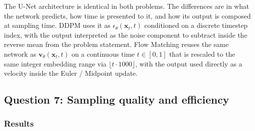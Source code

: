 \documentclass{article}
\begin{document}
The U-Net architecture is identical in both problems. The differences are
in what the network predicts, how time is presented to it, and how its
output is composed at sampling time. DDPM uses it as
$\epsilon_\theta(\mathbf{x}_t, t)$ conditioned on a discrete timestep
index, with the output interpreted as the noise component to subtract
inside the reverse mean from the problem statement. Flow Matching reuses
the same network as $\mathbf{v}_\theta(\mathbf{x}_t, t)$ on a continuous
time $t \in [0, 1]$ that is rescaled to the same integer embedding range
via $\lfloor t \cdot 1000\rfloor$, with the output used directly as a
velocity inside the Euler / Midpoint update.

\subsection*{Question 7: Sampling quality and efficiency}



\subsubsection*{Results}
\end{document}
